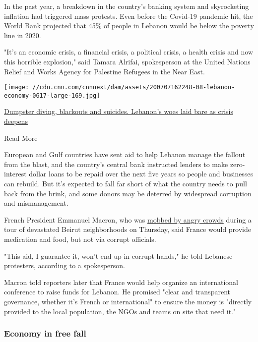 In the past year, a breakdown in the country's banking system and
skyrocketing inflation had triggered mass protests. Even before the
Covid-19 pandemic hit, the World Bank projected that
\href{https://cnn.com/2020/04/28/middleeast/lebanon-hunger-aid-coronavirus-intl/index.html}{45\%
of people in Lebanon} would be below the poverty line in 2020.

"It's an economic crisis, a financial crisis, a political crisis, a
health crisis and now this horrible explosion," said Tamara Alrifai,
spokesperson at the United Nations Relief and Works Agency for Palestine
Refugees in the Near East.

\href{/2020/07/08/middleeast/lebanon-economy-crisis-intl/index.html}{}

\texttt{[image: //cdn.cnn.com/cnnnext/dam/assets/200707162248-08-lebanon-economy-0617-large-169.jpg]}

\href{/2020/07/08/middleeast/lebanon-economy-crisis-intl/index.html}{Dumpster
diving, blackouts and suicides. Lebanon's woes laid bare as crisis
deepens}

Read More

European and Gulf countries have sent aid to help Lebanon manage the
fallout from the blast, and the country's central bank instructed
lenders to make zero-interest dollar loans to be repaid over the next
five years so people and businesses can rebuild. But it's expected to
fall far short of what the country needs to pull back from the brink,
and some donors may be deterred by widespread corruption and
mismanagement.

French President Emmanuel Macron, who was
\href{https://edition.cnn.com/2020/08/06/middleeast/beirut-explosion-anger-intl-hnk/index.html}{mobbed
by angry crowds} during a tour of devastated Beirut neighborhoods on
Thursday, said France would provide medication and food, but not via
corrupt officials.

"This aid, I guarantee it, won't end up in corrupt hands," he told
Lebanese protesters, according to a spokesperson.

Macron told reporters later that France would help organize an
international conference to raise funds for Lebanon. He promised "clear
and transparent governance, whether it's French or international" to
ensure the money is "directly provided to the local population, the NGOs
and teams on site that need it."

\hypertarget{economy-in-free-fall}{%
\subsubsection{Economy in free fall}\label{economy-in-free-fall}}

